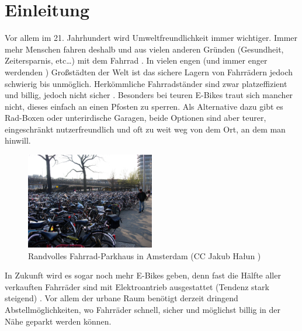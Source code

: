 \section{Einleitung}
Vor allem im 21. Jahrhundert wird Umweltfreundlichkeit immer wichtiger. Immer mehr Menschen fahren deshalb und aus vielen anderen Gründen (Gesundheit, Zeitersparnis, etc…) mit dem Fahrrad \cite{}. In vielen engen (und immer enger werdenden \cite{}) Großstädten der Welt ist das sichere Lagern von Fahrrädern jedoch schwierig bis unmöglich. Herkömmliche Fahrradständer sind zwar platzeffizient und billig, jedoch nicht sicher \cite{}. Besonders bei teuren E-Bikes traut sich mancher nicht, dieses einfach an einen Pfosten zu sperren. Als Alternative dazu gibt es Rad-Boxen oder unterirdische Garagen, beide Optionen sind aber teurer, eingeschränkt nutzerfreundlich und oft zu weit weg von dem Ort, an dem man hinwill.

\begin{figure}[ht]
  \centering
  \includegraphics[width=0.5\textwidth]{images/fahrrad_parkhaus_voll}
  \caption{Randvolles Fahrrad-Parkhaus in Amsterdam (CC Jakub Hałun \cite{cc})}
  \label{fig:fahrrad_parkhaus_voll}
\end{figure}

In Zukunft wird es sogar noch mehr E-Bikes geben, denn fast die Hälfte aller verkauften Fahrräder sind mit Elektroantrieb ausgestattet (Tendenz stark steigend) \cite{}. Vor allem der urbane Raum benötigt derzeit dringend Abstellmöglichkeiten, wo Fahrräder schnell, sicher und möglichst billig in der Nähe geparkt werden können.






